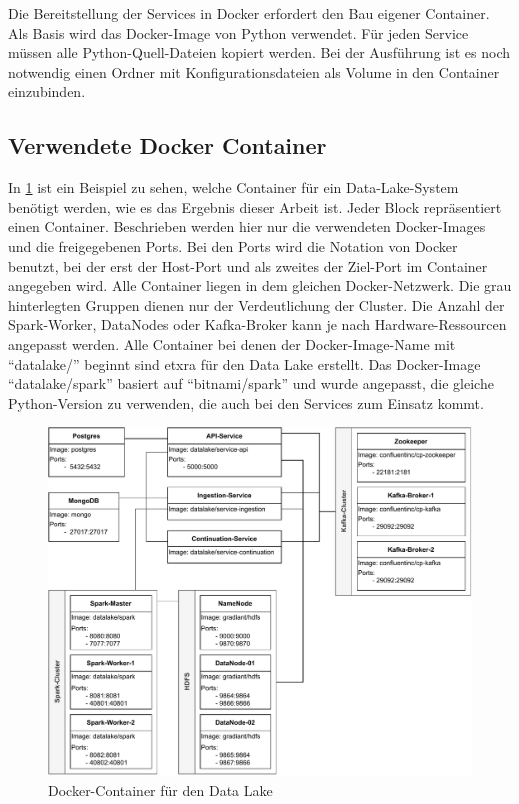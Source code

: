 Die Bereitstellung der Services in Docker erfordert den Bau eigener Container.
Als Basis wird das Docker-Image von Python verwendet.
Für jeden Service müssen alle Python-Quell-Dateien kopiert werden.
Bei der Ausführung ist es noch notwendig einen Ordner mit Konfigurationsdateien als Volume in den Container einzubinden.

\subsection{Verwendete Docker Container}

In \cref{fig:docker-datalake} ist ein Beispiel zu sehen, welche Container für ein Data-Lake-System benötigt werden, wie es das Ergebnis dieser Arbeit ist.
Jeder Block repräsentiert einen Container.
Beschrieben werden hier nur die verwendeten Docker-Images und die freigegebenen Ports.
Bei den Ports wird die Notation von Docker benutzt, bei der erst der Host-Port und als zweites der Ziel-Port im Container angegeben wird.
Alle Container liegen in dem gleichen Docker-Netzwerk.
Die grau hinterlegten Gruppen dienen nur der Verdeutlichung der Cluster.
Die Anzahl der Spark-Worker, DataNodes oder Kafka-Broker kann je nach Hardware-Ressourcen angepasst werden.
Alle Container bei denen der Docker-Image-Name mit "`datalake/"' beginnt sind etxra für den Data Lake erstellt.
Das Docker-Image "`datalake/spark"' basiert auf "`bitnami/spark"' und wurde angepasst, die gleiche Python-Version zu verwenden, die auch bei den Services zum Einsatz kommt.

\begin{figure}
    \centering
    \includegraphics[width=\textwidth]{Grafiken/Umsetzung-Docker-Lake.pdf}
    \caption{Docker-Container für den Data Lake}
    \label{fig:docker-datalake}
\end{figure}

